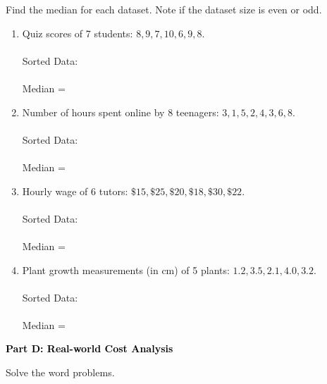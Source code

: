 \documentclass[12pt, letterpaper, fleqn]{article}
\newcommand{\blanklong}{\underline{\hspace{6.5cm}}}
\newcommand{\blankshorter}{\underline{\hspace{1.5cm}}}
\begin{document}
\vspace{3mm}

\noindent
Find the median for each dataset. Note if the dataset size is even or odd.

\vspace{5mm}

\begin{enumerate}[itemsep=2cm, leftmargin=0.6cm]
\item Quiz scores of 7 students: $8, 9, 7, 10, 6, 9, 8$. \\ \\
Sorted Data: \blanklong \\ \\
Median = \blankshorter

\item Number of hours spent online by 8 teenagers: $3, 1, 5, 2, 4, 3, 6, 8$. \\ \\
Sorted Data: \blanklong \\ \\
Median = \blankshorter

\item Hourly wage of 6 tutors: $\$15, \$25, \$20, \$18, \$30, \$22$. \\ \\
Sorted Data: \blanklong \\ \\
Median = \blankshorter

\item Plant growth measurements (in cm) of 5 plants: $1.2, 3.5, 2.1, 4.0, 3.2$. \\ \\
Sorted Data: \blanklong \\ \\
Median = \blankshorter
\end{enumerate}

\newpage

\begin{tcolorbox}[colback=black!10]
    \large\textcolor{black}{\textbf{Part D: Real-world Cost Analysis}}
\end{tcolorbox}

\vspace{3mm}

\noindent
Solve the word problems.

\vspace{5mm}
\end{document}
